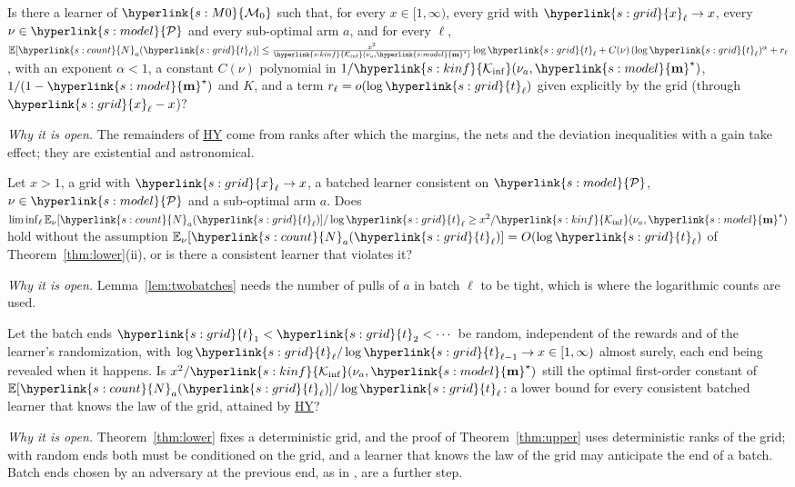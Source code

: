 \documentclass[10pt]{article}
\newcommand{\sy}[2]{{\hyperlink{#1}{#2}}}
\newcommand{\E}{\mathbb{E}}
\newcommand{\1}{\mathbf{1}}
\newcommand{\m}{\sy{s:model}{\mathbf{m}}}
\newcommand{\cP}{\sy{s:model}{\mathcal P}}
\newcommand{\Ki}{\sy{s:kinf}{\mathcal K_{\inf}}}
\newcommand{\Ng}{\sy{s:count}{N}}
\newcommand{\Mz}{\sy{s:M0}{\mathcal M_0}}
\newcommand{\tl}{\sy{s:grid}{t}}
\newcommand{\xg}{\sy{s:grid}{x}}
\newcommand{\HY}{\hyperref[def:hy]{\textup{HY}}}
\begin{document}
\begin{openquestion}\label{oq:remainders}
Is there a learner of $\Mz$ such that, for every $x\in[1,\infty)$, every grid with $\xg_\ell\to x$, every $\nu\in\cP$ and every
sub-optimal arm $a$, and for every $\ell$,
$\E[\Ng_a(\tl_\ell)]\le\frac{x^2}{\Ki(\nu_a,\m^\star)}\log\tl_\ell+C(\nu)\,(\log\tl_\ell)^{\alpha}+r_\ell$, with an exponent $\alpha<1$,
a constant $C(\nu)$ polynomial in $1/\Ki(\nu_a,\m^\star)$, $1/(1-\m^\star)$ and $K$, and a term $r_\ell=o(\log\tl_\ell)$ given
explicitly by the grid (through $\xg_\ell-x$)?
\end{openquestion}
\noindent\emph{Why it is open.} The remainders of \HY{} come from ranks after which the margins, the nets and the
deviation inequalities with a gain take effect; they are existential and astronomical.

\begin{openquestion}\label{oq:liminf}
Let $x>1$, a grid with $\xg_\ell\to x$, a batched learner consistent on $\cP$, $\nu\in\cP$ and a sub-optimal arm $a$. Does
$\liminf_\ell\E_\nu[\Ng_a(\tl_\ell)]/\log\tl_\ell\ge x^2/\Ki(\nu_a,\m^\star)$ hold without the assumption
$\E_\nu[\Ng_a(\tl_\ell)]=O(\log\tl_\ell)$ of Theorem~\ref{thm:lower}(ii), or is there a consistent learner that violates it?
\end{openquestion}
\noindent\emph{Why it is open.} Lemma~\ref{lem:twobatches} needs the number of pulls of $a$ in batch $\ell$ to be tight,
which is where the logarithmic counts are used.

\begin{openquestion}\label{oq:random}
Let the batch ends $\tl_1<\tl_2<\cdots$ be random, independent of the rewards and of the learner's randomization, with
$\log\tl_\ell/\log\tl_{\ell-1}\to x\in[1,\infty)$ almost surely, each end being revealed when it happens. Is
$x^2/\Ki(\nu_a,\m^\star)$ still the optimal first-order constant of $\E[\Ng_a(\tl_\ell)]/\log\tl_\ell$: a lower bound for every
consistent batched learner that knows the law of the grid, attained by \HY?
\end{openquestion}
\noindent\emph{Why it is open.} Theorem~\ref{thm:lower} fixes a deterministic grid, and the proof of
Theorem~\ref{thm:upper} uses deterministic ranks of the grid; with random ends both must be conditioned on the grid, and a
learner that knows the law of the grid may anticipate the end of a batch. Batch ends chosen by an adversary at the previous end, as in \citep[Section~II.A]{KO21b},
are a further step.
\end{document}
